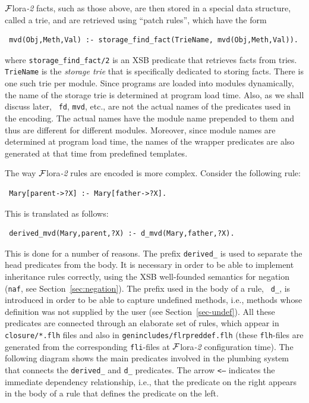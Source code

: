 \documentclass[11pt]{article}
\newcommand{\FLORA}{{\mbox{\sc ${\cal F}${lora}\rm\emph{-2}}}\xspace}
\newcommand{\RULELOGNAF}{{{\tt naf}}\xspace}
\begin{document}
\FLORA facts, such as those above, are then stored in a special data structure,
called a {\rm trie}, and are retrieved using  ``patch rules'', which have the
form
\begin{verbatim}
 mvd(Obj,Meth,Val) :- storage_find_fact(TrieName, mvd(Obj,Meth,Val)).  
\end{verbatim}
where {\tt storage\_find\_fact/2} is an XSB predicate that retrieves facts
from tries. {\tt TrieName} is the \emph{storage trie} that is specifically
dedicated to storing facts. There is one such trie per module. Since
programs are loaded into modules dynamically, the name of the storage trie
is determined at program load time. Also, as we shall discuss later, {\tt
  fd}, {\tt mvd}, etc., are not the actual names of the predicates used in
the encoding. The actual names have the module name prepended to them and
thus are different for different modules. Moreover, since module names are
determined at program load time, the names of the wrapper predicates are
also generated at that time from predefined templates.

The way \FLORA rules are encoded is more complex. Consider the following rule:
\begin{verbatim}
 Mary[parent->?X] :- Mary[father->?X].  
\end{verbatim}
This is translated as follows:
\begin{verbatim}
 derived_mvd(Mary,parent,?X) :- d_mvd(Mary,father,?X).  
\end{verbatim}
This is done for a number of reasons. The prefix {\tt derived\_} is used to
separate the head predicates from the body. It is necessary in order to
be able to implement inheritance rules correctly, using the XSB
well-founded semantics for negation (\RULELOGNAF, see
Section~\ref{sec:negation}). The prefix used in the body of a rule, {\tt
  d\_}, is introduced in order to be able to capture undefined methods,
i.e., methods whose definition was not supplied by the user (see
Section~\ref{sec-undef}). All these predicates are connected through an
elaborate set of rules, which appear in {\tt closure/*.flh} files and also
in {\tt genincludes/flrpreddef.flh} (these {\tt flh}-files are generated
from the corresponding {\tt fli}-files at \FLORA configuration time).
The following diagram shows the main
predicates involved in the plumbing system that connects
the {\tt derived\_} and {\tt d\_} predicates. The arrow {\tt <---} indicates the
immediate dependency relationship, i.e., that the predicate on the
right appears in the body of a rule that defines the predicate on the left.
\end{document}
